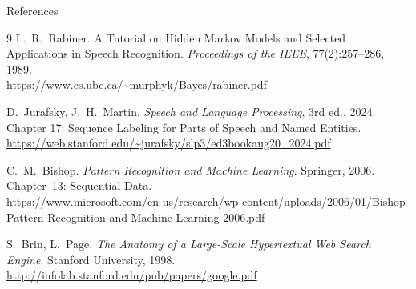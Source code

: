 \documentclass[aspectratio=169,t]{beamer}
\begin{document}
\begin{frame}{References}
  \begin{thebibliography}{9}
      L.~R.~Rabiner.
      A Tutorial on Hidden Markov Models and Selected Applications in Speech Recognition.
      \textit{Proceedings of the IEEE}, 77(2):257--286, 1989.\\
      \url{https://www.cs.ubc.ca/~murphyk/Bayes/rabiner.pdf}

      D.~Jurafsky, J.~H.~Martin.
      \textit{Speech and Language Processing}, 3rd ed., 2024.
      Chapter 17: Sequence Labeling for Parts of Speech and Named Entities.\\
      \url{https://web.stanford.edu/~jurafsky/slp3/ed3bookaug20_2024.pdf}

      C.~M.~Bishop.
      \textit{Pattern Recognition and Machine Learning}.
      Springer, 2006. Chapter~13: Sequential Data.\\
      \url{https://www.microsoft.com/en-us/research/wp-content/uploads/2006/01/Bishop-Pattern-Recognition-and-Machine-Learning-2006.pdf}

      S.~Brin, L.~Page.
      \textit{The Anatomy of a Large-Scale Hypertextual Web Search Engine}.
      Stanford University, 1998.\\
      \url{http://infolab.stanford.edu/pub/papers/google.pdf}
  \end{thebibliography}
\end{frame}
\end{document}
